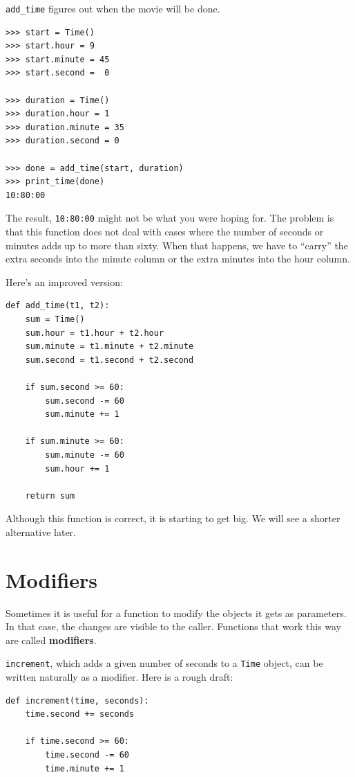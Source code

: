 \documentclass[10pt]{book}
\begin{document}
\begin{CJK}{UTF8}{gbsn}
\verb"add_time" figures out when the movie will be done.

\begin{verbatim}
>>> start = Time()
>>> start.hour = 9
>>> start.minute = 45
>>> start.second =  0

>>> duration = Time()
>>> duration.hour = 1
>>> duration.minute = 35
>>> duration.second = 0

>>> done = add_time(start, duration)
>>> print_time(done)
10:80:00
\end{verbatim}
%
The result, {\tt 10:80:00} might not be what you were hoping
for.  The problem is that this function does not deal with cases where the
number of seconds or minutes adds up to more than sixty.  When that
happens, we have to ``carry'' the extra seconds into the minute column
or the extra minutes into the hour column.

Here's an improved version:

\begin{verbatim}
def add_time(t1, t2):
    sum = Time()
    sum.hour = t1.hour + t2.hour
    sum.minute = t1.minute + t2.minute
    sum.second = t1.second + t2.second

    if sum.second >= 60:
        sum.second -= 60
        sum.minute += 1

    if sum.minute >= 60:
        sum.minute -= 60
        sum.hour += 1

    return sum
\end{verbatim}
%
Although this function is correct, it is starting to get big.
We will see a shorter alternative later.


\section{Modifiers}
\label{increment}

Sometimes it is useful for a function to modify the objects it gets as
parameters.  In that case, the changes are visible to the caller.
Functions that work this way are called {\bf modifiers}.

{\tt increment}, which adds a given number of seconds to a {\tt Time}
object, can be written naturally as a
modifier.  Here is a rough draft:

\begin{verbatim}
def increment(time, seconds):
    time.second += seconds

    if time.second >= 60:
        time.second -= 60
        time.minute += 1


\end{verbatim}
\end{CJK}
\end{document}
